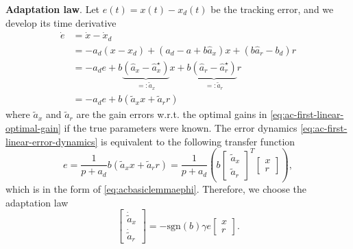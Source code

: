 \documentclass[
]{book}
\theoremstyle{definition}
\theoremstyle{definition}
\theoremstyle{definition}
\theoremstyle{definition}
\theoremstyle{remark}
\begin{document}
\textbf{Adaptation law}. Let \(e(t) = x(t) - x_d(t)\) be the tracking error, and we develop its time derivative
\begin{align}
\dot{e} &= \dot{x} - \dot{x}_d \\
        &= - a_d (x - x_d) + (a_d - a + b\hat{a}_x)x + (b \hat{a}_r - b_d) r \\
        & = - a_d e + b\underbrace{(\hat{a}_x - \hat{a}_x^\star)}_{=:\tilde{a}_x} x + b \underbrace{(\hat{a}_r - \hat{a}_r^\star )}_{=:\tilde{a}_r} r \\
        & = - a_d e + b (\tilde{a}_x x + \tilde{a}_r r) \label{eq:ac-first-linear-error-dynamics}
\end{align}
where \(\tilde{a}_x\) and \(\tilde{a}_r\) are the gain errors w.r.t. the optimal gains in \eqref{eq:ac-first-linear-optimal-gain} if the true parameters were known. The error dynamics \eqref{eq:ac-first-linear-error-dynamics} is equivalent to the following transfer function
\begin{equation}
e = \frac{1}{p + a_d} b(\tilde{a}_x x + \tilde{a}_r r) = \frac{1}{p + a_d} \left(b 
\begin{bmatrix} \tilde{a}_x \\ \tilde{a}_r \end{bmatrix}^T 
\begin{bmatrix} x \\ r \end{bmatrix}
\right),
\label{eq:ac-first-linear-error-dynamics-transfer}
\end{equation}
which is in the form of \eqref{eq:acbasiclemmaephi}. Therefore, we choose the adaptation law
\begin{equation}
\begin{bmatrix} \dot{\tilde{a}}_x \\ \dot{\tilde{a}}_r \end{bmatrix} = - \mathrm{sgn}(b) \gamma e \begin{bmatrix} x \\ r \end{bmatrix}.
\label{eq:ac-first-linear-adaptation-law}
\end{equation}
\end{document}
